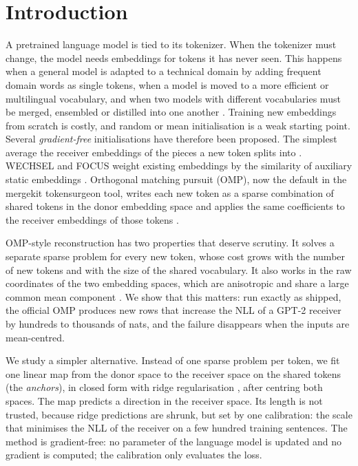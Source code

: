 \documentclass[preprint,12pt]{elsarticle}
\begin{document}
\section{Introduction}
\label{sec:intro}
A pretrained language model is tied to its tokenizer. When the tokenizer must change, the model needs embeddings for tokens it has never seen. This happens when a general model is adapted to a technical domain by adding frequent domain words as single tokens, when a model is moved to a more efficient or multilingual vocabulary, and when two models with different vocabularies must be merged, ensembled or distilled into one another \cite{goddard2024mergekit,minixhofer2024zett,mundra2024empirical}. Training new embeddings from scratch is costly, and random or mean initialisation is a weak starting point. Several \emph{gradient-free} initialisations have therefore been proposed. The simplest average the receiver embeddings of the pieces a new token splits into \cite{gee2022fvt,hewitt2021initializing}. WECHSEL and FOCUS weight existing embeddings by the similarity of auxiliary static embeddings \cite{minixhofer2022wechsel,dobler2023focus}. Orthogonal matching pursuit (OMP), now the default in the mergekit tokensurgeon tool, writes each new token as a sparse combination of shared tokens in the donor embedding space and applies the same coefficients to the receiver embeddings of those tokens \cite{goddard2025omp,goddard2024mergekit}.

OMP-style reconstruction has two properties that deserve scrutiny. It solves a separate sparse problem for every new token, whose cost grows with the number of new tokens and with the size of the shared vocabulary. It also works in the raw coordinates of the two embedding spaces, which are anisotropic and share a large common mean component \cite{ethayarajh2019contextual,mu2018allbutthetop}. We show that this matters: run exactly as shipped, the official OMP produces new rows that increase the NLL of a GPT-2 receiver by hundreds to thousands of nats, and the failure disappears when the inputs are mean-centred.

We study a simpler alternative. Instead of one sparse problem per token, we fit one linear map from the donor space to the receiver space on the shared tokens (the \emph{anchors}), in closed form with ridge regularisation \cite{hoerl1970ridge}, after centring both spaces. The map predicts a direction in the receiver space. Its length is not trusted, because ridge predictions are shrunk, but set by one calibration: the scale that minimises the NLL of the receiver on a few hundred training sentences. The method is gradient-free: no parameter of the language model is updated and no gradient is computed; the calibration only evaluates the loss.
\end{document}
